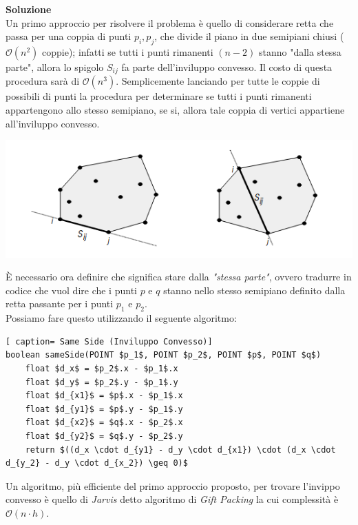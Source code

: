 \documentclass[../cheatSheetAlgoritmi.tex]{subfiles}
\begin{document}
\bigskip
\textbf{Soluzione} \\
Un primo approccio per risolvere il problema è quello di considerare retta che passa per una coppia di punti $p_i, p_j$, che divide il piano in due semipiani chiusi ($\mathcal{O}(n^2)$ coppie); infatti se tutti i punti rimanenti $(n - 2)$ stanno "dalla stessa parte", allora lo spigolo $S_{ij}$ fa parte dell'inviluppo convesso. Il costo di questa procedura sarà di $\mathcal{O}(n^3)$. Semplicemente lanciando per tutte le coppie di possibili di punti la procedura per determinare se tutti i punti rimanenti appartengono allo stesso semipiano, se si, allora tale coppia di vertici appartiene all'inviluppo convesso.
\begin{center}
	\includegraphics{../img/backtracking_inviluppo_convesso}
\end{center}
È necessario ora definire che significa stare dalla \emph{"stessa parte"}, ovvero tradurre in codice che vuol dire che i punti $p$ e $q$ stanno nello stesso semipiano definito dalla retta passante per i punti $p_1$ e $p_2$. \\
Possiamo fare questo utilizzando il seguente algoritmo:
 \begin{lstlisting}[ caption= Same Side (Inviluppo Convesso)]
boolean sameSide(POINT $p_1$, POINT $p_2$, POINT $p$, POINT $q$)
	float $d_x$ = $p_2$.x - $p_1$.x
	float $d_y$ = $p_2$.y - $p_1$.y
	float $d_{x1}$ = $p$.x - $p_1$.x
	float $d_{y1}$ = $p$.y - $p_1$.y
	float $d_{x2}$ = $q$.x - $p_2$.x
	float $d_{y2}$ = $q$.y - $p_2$.y
	return $((d_x \cdot d_{y1} - d_y \cdot d_{x1}) \cdot (d_x \cdot d_{y_2} - d_y \cdot d_{x_2}) \geq 0)$
\end{lstlisting}
Un algoritmo, più efficiente del primo approccio proposto, per trovare l'invippo convesso è quello di \emph{Jarvis} detto algoritmo di \emph{Gift Packing} la cui complessità è $\mathcal{O}(n \cdot h)$.
\end{document}
